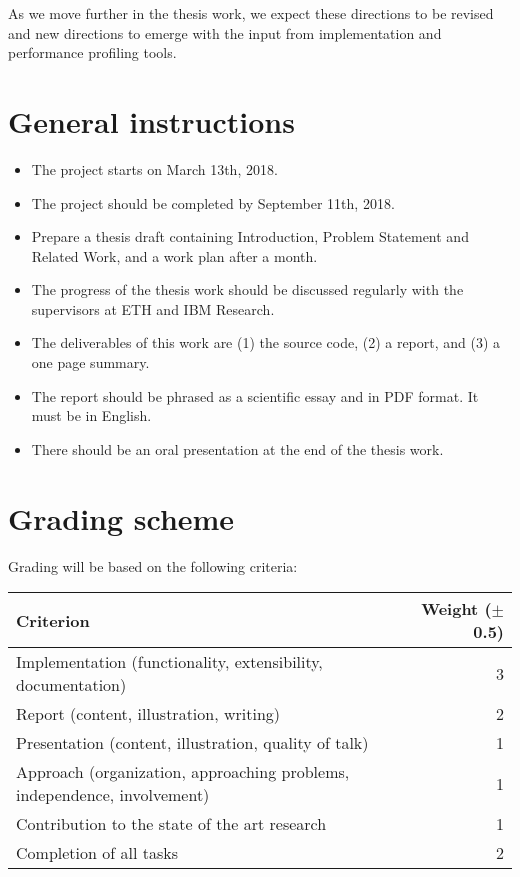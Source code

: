 \documentclass[10pt,a4paper]{article}
\begin{document}
As we move further in the thesis work, we expect these directions to be 
revised and new directions to emerge with the input from implementation 
and performance profiling tools.  

\section*{General instructions}

\begin{itemize} 
  
  \item The project starts on March 13th, 2018.
  
  \item The project should be completed by September 11th, 2018.

  \item Prepare a thesis draft containing Introduction, Problem Statement and
  Related Work, and a work plan after a month.
  
  \item The progress of the thesis work should be discussed regularly with
  the supervisors at ETH and IBM Research.
  
  \item The deliverables of this work are (1) the source code, (2) a
  report, and (3) a one page summary.
  
  \item The report should be phrased as a scientific essay and in PDF format.
  It must be in English. 
  
  \item There should be an oral presentation at the end of the thesis
  work.
  
\end{itemize}


\section*{Grading scheme}

Grading will be based on the following criteria:

\begin{center}
\begin{tabular}{lr}
\toprule
Criterion & Weight ($\pm$ 0.5) \\
\midrule
Implementation (functionality, extensibility, documentation) & 3 \\
Report (content, illustration, writing) & 2 \\
Presentation (content, illustration, quality of talk) & 1 \\
Approach (organization, approaching problems, independence, involvement) & 1
\\
Contribution to the state of the art research & 1 \\
Completion of all tasks & 2 \\
\bottomrule
\end{tabular}
\end{center}
\end{document}

